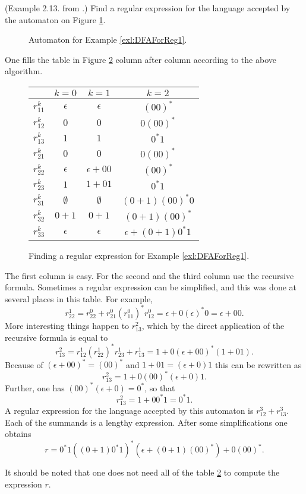

\setcounter{section}{2}
\setcounter{subsection}{2}
\setcounter{dfn}{11}

\begin{exl}
\label{exl:DFAForReg1}
(Example 2.13. from \cite{HU79}.)
Find a regular expression for the language accepted by the automaton on Figure \ref{fig:DFAForReg1}.
\begin{figure}[ht]
\begin{center}

\end{center}
\caption{Automaton for Example \ref{exl:DFAForReg1}.}
\label{fig:DFAForReg1}
\end{figure}

One fills the table in Figure \ref{fig:TableRegExp} column after column according to the above algorithm.

\begin{figure}[ht]
\begin{center}
\begin{tabular}{c|ccc}
& $k=0$ & $k=1$ & $k=2$\\
\hline
$r_{11}^k$ & $\epsilon$ & $\epsilon$ & $(00)^*$\\
$r_{12}^k$ & $0$ & $0$ & $0(00)^*$\\
$r_{13}^k$ & $1$ & $1$ & $0^*1$\\
$r_{21}^k$ & $0$ & $0$ & $0(00)^*$\\
$r_{22}^k$ & $\epsilon$ & $\epsilon + 00$ & $(00)^*$\\
$r_{23}^k$ & $1$ & $1 + 01$ & $0^*1$\\
$r_{31}^k$ & $\emptyset$ & $\emptyset$ & $(0+1)(00)^*0$\\
$r_{32}^k$ & $0+1$ & $0+1$ & $(0+1)(00)^*$\\
$r_{33}^k$ & $\epsilon$ & $\epsilon$ & $\epsilon + (0+1)0^*1$
\end{tabular}
\end{center}
\caption{Finding a regular expression for Example \ref{exl:DFAForReg1}.}
\label{fig:TableRegExp}
\end{figure}

The first column is easy.
For the second and the third column use the recursive formula.
Sometimes a regular expression can be simplified, and this was done at several places in this table.
For example,
\[
r_{22}^1 = r_{22}^0 + r_{21}^0(r_{11}^0)^*r_{12}^0 = \epsilon + 0(\epsilon)^*0 = \epsilon + 00.
\]
More interesting things happen to $r_{13}^2$, which by the direct application of the recursive formula is equal to
\[
r_{13}^2 = r_{12}^1(r_{22}^1)^*r_{23}^1 + r_{13}^1 = 1+ 0(\epsilon + 00)^*(1+01).
\]
Because of $(\epsilon + 00)^* = (00)^*$ and $1+01 = (\epsilon + 0)1$ this can be rewritten as
\[
r_{13}^2 = 1 + 0(00)^*(\epsilon + 0)1.
\]
Further, one has $(00)^*(\epsilon + 0) = 0^*$, so that
\[
r_{13}^2 = 1 + 00^*1 = 0^*1.
\]
A regular expression for the language accepted by this automaton is $r_{12}^3 + r_{13}^3$.
Each of the summands is a lengthy expression. After some simplifications one obtains
\[
r = 0^*1((0+1)0^*1)^*(\epsilon+(0+1)(00)^*) + 0(00)^*.
\]

It should be noted that one does not need all of the table \ref{fig:TableRegExp} to compute the expression $r$.
\end{exl}

